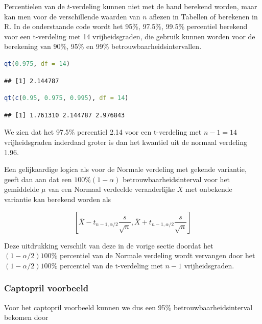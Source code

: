 \documentclass[
  12pt,dutch,coursenotes]{book}
\begin{document}
Percentielen van de \(t\)-verdeling kunnen niet met de hand berekend worden,
maar kan men voor de verschillende waarden van \(n\) aflezen in Tabellen of berekenen in R.
In de onderstaande code wordt het 95\%, 97.5\%, 99.5\% percentiel berekend voor een t-verdeling met 14 vrijheidsgraden, die gebruik kunnen worden voor de berekening van 90\%, 95\% en 99\% betrouwbaarheidsintervallen.

\begin{lstlisting}[language=R]
qt(0.975, df = 14)
\end{lstlisting}

\begin{lstlisting}
## [1] 2.144787
\end{lstlisting}

\begin{lstlisting}[language=R]
qt(c(0.95, 0.975, 0.995), df = 14)
\end{lstlisting}

\begin{lstlisting}
## [1] 1.761310 2.144787 2.976843
\end{lstlisting}

We zien dat het 97.5\% percentiel 2.14 voor een t-verdeling met \(n-1=14\) vrijheidsgraden inderdaad groter is dan het kwantiel uit de normaal verdeling 1.96.

Een gelijkaardige logica als voor de Normale verdeling met gekende variantie, geeft dan aan dat een \(100\% (1-\alpha)\) betrouwbaarheidsinterval voor het gemiddelde \(\mu\) van een
Normaal verdeelde veranderlijke \(X\) met onbekende variantie kan berekend
worden als

\begin{equation*}
\left[\bar{X} - t_{n-1, \alpha/2} \frac{s}{\sqrt{n}} , \bar{X} + t_{n-1,
\alpha/2} \frac{s}{\sqrt{n}}\right]
\end{equation*}

Deze uitdrukking verschilt van deze in de vorige sectie doordat het \((1-\alpha/2)100\%\) percentiel van de Normale verdeling wordt vervangen door
het \((1-\alpha/2)100\%\) percentiel van de t-verdeling met \(n-1\)
vrijheidsgraden.

\hypertarget{captopril-voorbeeld-1}{%
\subsubsection{Captopril voorbeeld}\label{captopril-voorbeeld-1}}

Voor het captopril voorbeeld kunnen we dus een 95\% betrouwbaarheidsinterval bekomen door
\end{document}
